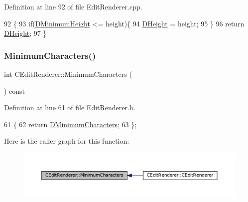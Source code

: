 Definition at line 92 of file Edit\+Renderer.\+cpp.


\begin{DoxyCode}
92                                    \{
93     \textcolor{keywordflow}{if}(\hyperlink{classCEditRenderer_a9e063123747e147ef1c35bd962205fbd}{DMinimumHeight} <= height)\{
94         \hyperlink{classCEditRenderer_ade8dedb4f9790d28b38da8ef20a171cb}{DHeight} = height;   
95     \}
96     \textcolor{keywordflow}{return} \hyperlink{classCEditRenderer_ade8dedb4f9790d28b38da8ef20a171cb}{DHeight};
97 \}
\end{DoxyCode}
\hypertarget{classCEditRenderer_a36726cc31fedec0820076c03186158e7}{}\label{classCEditRenderer_a36726cc31fedec0820076c03186158e7} 
\subsubsection{\texorpdfstring{Minimum\+Characters()}{MinimumCharacters()}\hspace{0.1cm}{\footnotesize\ttfamily [1/2]}}
{\footnotesize\ttfamily int C\+Edit\+Renderer\+::\+Minimum\+Characters (\begin{DoxyParamCaption}{ }\end{DoxyParamCaption}) const\hspace{0.3cm}{\ttfamily [inline]}}



Definition at line 61 of file Edit\+Renderer.\+h.


\begin{DoxyCode}
61                                      \{
62             \textcolor{keywordflow}{return} \hyperlink{classCEditRenderer_ae5d0bd249b2d483c361b0bf9c16c15d3}{DMinimumCharacters};  
63         \};
\end{DoxyCode}
Here is the caller graph for this function\+:\nopagebreak
\begin{figure}[H]
\begin{center}
\leavevmode
\includegraphics[width=350pt]{classCEditRenderer_a36726cc31fedec0820076c03186158e7_icgraph}
\end{center}
\end{figure}
\hypertarget{classCEditRenderer_a0ed256b9ca7726b2f7de88b4682ed595}{}\label{classCEditRenderer_a0ed256b9ca7726b2f7de88b4682ed595} 

